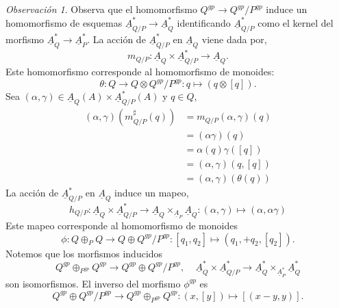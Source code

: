 \documentclass[12pt,spanish]{amsart}
\theoremstyle{definition}
\theoremstyle{remark}
\newtheorem{obs}[Theorem]{Observación}
\begin{document}
\begin{obs}
Observa que el homomorfismo $Q^{gp} \to Q^{gp}/P^{gp}$ induce un homomorfismo de esquemas $\underline{A}_{Q/P}^{\ast} \to \underline{A}_{Q}^{\ast}$ identificando $\underline{A}_{Q/P}^{\ast}$ como el kernel del morfismo $\underline{A}_{Q}^{\ast} \to \underline{A}_{P}^{\ast}$. La acción de $\underline{A}_{Q/P}^{\ast}$ en $\underline{A}_{Q}$ viene dada por,
$$m_{Q/P}: \underline{A}_{Q} \times \underline{A}_{Q/P}^{\ast} \to \underline{A}_{Q}.$$
Este homomorfismo corresponde al homomorfismo de monoides:
$$\theta: Q \to Q \otimes Q^{gp}/P^{gp}:q \mapsto (q\otimes [q]).$$
Sea $(\alpha,\gamma)\in \underline{A}_{Q}(A) \times \underline{A}_{Q/P}^{\ast}(A)$ y $q\in Q$,
\begin{equation*}
\begin{split}
(\alpha,\gamma)(m^{ \sharp}_{Q/P}(q)) &= m_{Q/P}(\alpha,\gamma)(q) \\
&= (\alpha \gamma)(q) \\
&= \alpha(q) \gamma([q]) \\
&= (\alpha,\gamma)(q,[q]) \\
&= (\alpha,\gamma)(\theta(q))
\end{split}
\end{equation*}
La acción de $\underline{A}_{Q/P}^{\ast}$ en $\underline{A}_{Q}$ induce un mapeo,
$$h_{Q/P}:\underline{A}_{Q} \times \underline{A}_{Q/P}^{\ast} \to \underline{A}_{Q} \times_{\underline{A}_{P}} \underline{A}_{Q}: (\alpha, \gamma) \mapsto (\alpha,\alpha \gamma)$$
Este mapeo corresponde al homomorfismo de monoides
$$\phi: Q \oplus_{P} Q \to Q\oplus Q^{gp}/P^{gp}:[q_{1},q_{2}] \mapsto (q_{1},+q_{2},[q_{2}]).$$
Notemos que los morfismos inducidos 
$$Q^{gp} \oplus_{P^{gp}} Q^{gp} \to Q^{gp} \oplus Q^{gp}/P^{gp},~~~~~ \underline{A}_{Q}^{\ast} \times \underline{A}_{Q/P}^{\ast} \to \underline{A}_{Q}^{\ast} \times_{\underline{A}_{P}^{\ast}} \underline{A}_{Q}^{\ast}$$
son isomorfismos. El inverso del morfismo $\phi^{gp}$ es
$$Q^{gp} \oplus Q^{gp} /P^{gp} \to Q^{gp} \oplus_{P^{gp}} Q^{gp}: (x,[y]) \mapsto [(x-y,y)].$$
\end{obs}
\end{document}
